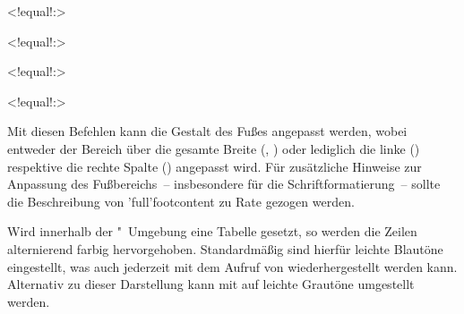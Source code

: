\begin{DeclareEntity}{}
\begin{NoIndexDefault}
\begin{Declaration}
  {}
  <!equal!:>
\begin{Declaration}
  {}
  <!equal!:>
\begin{Declaration}
  {}
  <!equal!:>
\begin{Declaration}
  {}
  <!equal!:>
\printdeclarationlist

Mit diesen Befehlen kann die Gestalt des Fußes angepasst werden, wobei entweder 
der Bereich über die gesamte Breite (, ) 
oder lediglich die linke () respektive die rechte Spalte 
() angepasst wird. Für zusätzliche Hinweise zur Anpassung 
des Fußbereichs~-- insbesondere für die Schriftformatierung~-- sollte die 
Beschreibung von \Macro'full'{footcontent} zu Rate gezogen werden.
\end{Declaration}
\end{Declaration}
\end{Declaration}
\end{Declaration}

\begin{Declaration}
  {}
\begin{Declaration}
  {}
\begin{Declaration}
  {}
\printdeclarationlist

Wird innerhalb der "~Umgebung eine Tabelle gesetzt, 
so werden die Zeilen alternierend farbig hervorgehoben. Standardmäßig sind 
hierfür leichte Blautöne eingestellt, was auch jederzeit mit dem Aufruf von 
 wiederhergestellt werden kann. Alternativ zu dieser 
Darstellung kann mit  auf leichte Grautöne umgestellt werden.
\end{Declaration}
\end{Declaration}
\end{Declaration}

\begin{Declaration}
  {}
\printdeclarationlist


\end{Declaration}
\end{NoIndexDefault}
\end{DeclareEntity}
